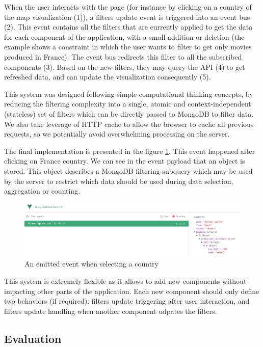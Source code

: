 \documentclass[a4paper,10pt]{article}
\begin{document}
When the user interacts with the page (for instance by clicking on a country of the
map visualization (1)), a filters update event is triggered into an event bus (2). This
event contains all the filters that are currently applied to get the data for each
component of the application, with a small addition or deletion (the example shows
a constraint in which the user wants to filter to get only movies produced in France).
The event bus redirects this filter to all the subscribed components (3). Based on
the new filters, they may query the API (4) to get refreshed data, and can update
the visualization consequently (5).

This system was designed following simple computational thinking concepts, by reducing
the filtering complexity into a single, atomic and context-independent (stateless) set of filters which can be directly
passed to MongoDB to filter data. We also take leverage of HTTP cache to allow
the browser to cache all previous requests, so we potentially avoid overwhelming processing
on the server.

The final implementation is presented in the figure \ref{fig:screen-filtering}.
This event happened after clicking on France country. We can see in the event
payload that an object is stored. This object describes a MongoDB filtering subquery
which may be used by the server to restrict which data should be used during data
selection, aggregation or counting.

\begin{figure}[ht]
   \centering
   \includegraphics[width=1\linewidth]{images/screens/filtering-example.png}
  \caption{An emitted event when selecting a country} \label{fig:screen-filtering}
\end{figure}

This system is extremely flexible as it allows to add new components without impacting
other parts of the application. Each new component should only define two behaviors (if required):
filters update triggering after user interaction, and filters update handling when
another component udpates the filters.

\subsection{Evaluation}
\end{document}
